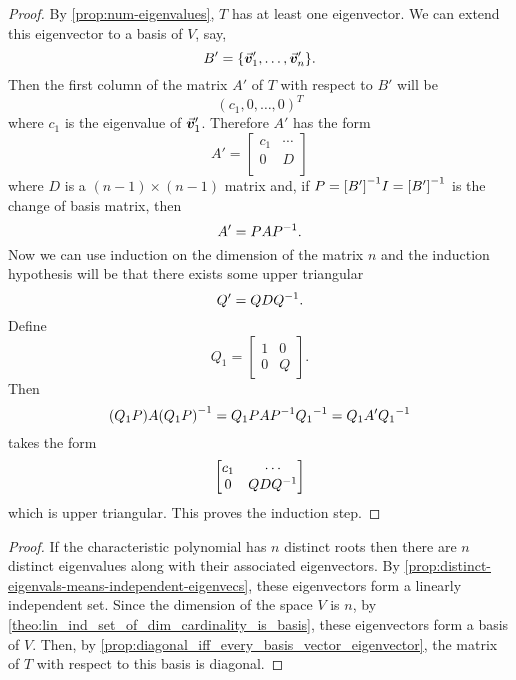 \documentclass[../MathsNotesBase.tex]{subfiles}
\begin{document}
{		\bigskip
		\begin{proof}
			By \autoref{prop:num-eigenvalues}, $T$ has at least one eigenvector. We can extend this eigenvector to a basis of $V$, say,
			\[ B' = \{\vec{\bm{v}}_1',\dots,\vec{\bm{v}}_n'\}. \]
			Then the first column of the matrix $A'$ of $T$ with respect to $B'$ will be
			\[ (c_1,0,\dots,0)^T \]
			where $c_1$ is the eigenvalue of $\vec{\bm{v}}_1'$. Therefore $A'$ has the form
			\[
				A' = \begin{bmatrix}
					c_1 & \cdots \\
					0   &   D \\
					\end{bmatrix} 
			\]
			where $D$ is a ${ (n-1) \times (n-1) }$ matrix and, if ${ P = {[B']}^{-1}I = {[B']}^{-1} }$ is the change of basis matrix, then
			\[ A' = PA{P}^{-1}. \]
			Now we can use induction on the dimension of the matrix $n$ and the induction hypothesis will be that there exists some upper triangular
			\[ Q' = QD{Q}^{-1}. \]
			Define
			\[ Q_1 = \begin{bmatrix}
					1 & 0\\
					0 & Q
					\end{bmatrix}. 
			\]
			Then
			\[ (Q_1P)A{(Q_1P)}^{-1} = Q_1PA{P}^{-1}{Q_1}^{-1} = Q_1A'{Q_1}^{-1} \]
			takes the form
			\[
				\begin{bmatrix}
				c_1 & \cdots\\
				0   & QD{Q}^{-1}
				\end{bmatrix} 
			\]
			which is upper triangular. This proves the induction step.
		\end{proof}
	
		\medskip{}

	
		\bigskip
		\begin{proof}
			If the characteristic polynomial has $n$ distinct roots then there are $n$ distinct eigenvalues along with their associated eigenvectors. By \autoref{prop:distinct-eigenvals-means-independent-eigenvecs}, these eigenvectors form a linearly independent set. Since the dimension of the space $V$ is $n$, by \autoref{theo:lin_ind_set_of_dim_cardinality_is_basis}, these eigenvectors form a basis of $V$. Then, by \autoref{prop:diagonal_iff_every_basis_vector_eigenvector}, the matrix of $T$ with respect to this basis is diagonal.
		\end{proof}
	
}
\end{document}
